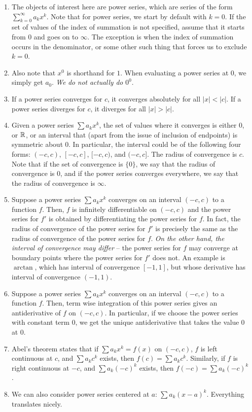 \documentclass{amsart}
\begin{document}
\begin{enumerate}
\item The objects of interest here are power series, which are series
  of the form $\sum_{k=0}^\infty a_kx^k$. Note that for power series,
  we start by default with $k = 0$. If the set of values of the index
  of summation is not specified, assume that it starts from $0$ and
  goes on to $\infty$. The exception is when the index of summation
  occurs in the denominator, or some other such thing that forces us
  to exclude $k = 0$.
\item Also note that $x^0$ is shorthand for $1$. When
  evaluating a power series at $0$, we simply get $a_0$. {\em We do
  not actually do $0^0$}.
\item If a power series converges for $c$, it converges absolutely for
  all $|x| < |c|$. If a power series diverges for $c$, it diverges for
  all $|x| > |c|$.
\item Given a power series $\sum a_kx^k$, the set of values where it
  converges is either $0$, or $\mathbb{R}$, or an interval that (apart from
  the issue of inclusion of endpoints) is symmetric about $0$. In
  particular, the interval could be of the following four forms:
  $(-c,c)$, $[-c,c]$, $[-c,c)$, and $(-c,c]$. The radius of
  convergence is $c$. Note that if the set of convergence is $\{ 0
  \}$, we say that the radius of convergence is $0$, and if the power
  series converges everywhere, we say that the radius of convergence
  is $\infty$.
\item Suppose a power series $\sum a_kx^k$ converges on an interval
  $(-c,c)$ to a function $f$. Then, $f$ is infinitely differentiable
  on $(-c,c)$ and the power series for $f'$ is obtained by
  differentiating the power series for $f$. In fact, the radius of
  convergence of the power series for $f'$ is precisely the same as
  the radius of convergence of the power series for $f$. {\em On the
  other hand, the interval of convergence may differ} -- the power
  series for $f$ may converge at boundary points where the power
  series for $f'$ does not. An example is $\arctan$, which has
  interval of convergence $[-1,1]$, but whose derivative has interval
  of convergence $(-1,1)$.
\item Suppose a power series $\sum a_kx^k$ converges on an interval
  $(-c,c)$ to a function $f$. Then, term wise integration of this
  power series gives an antiderivative of $f$ on $(-c,c)$. In
  particular, if we choose the power series with constant term $0$, we
  get the unique antiderivative that takes the value $0$ at $0$.
\item Abel's theorem states that if $\sum a_kx^k = f(x)$ on $(-c,c)$,
  $f$ is left continuous at $c$, and $\sum a_kc^k$ exists, then $f(c)
  = \sum a_kc^k$. Similarly, if $f$ is right continuous at $-c$, and
  $\sum a_k(-c)^k$ exists, then $f(-c) = \sum a_k(-c)^k$.
\item We can also consider power series centered at $a$: $\sum a_k (x
  - a)^k$. Everything translates nicely.
\end{enumerate}
\end{document}
